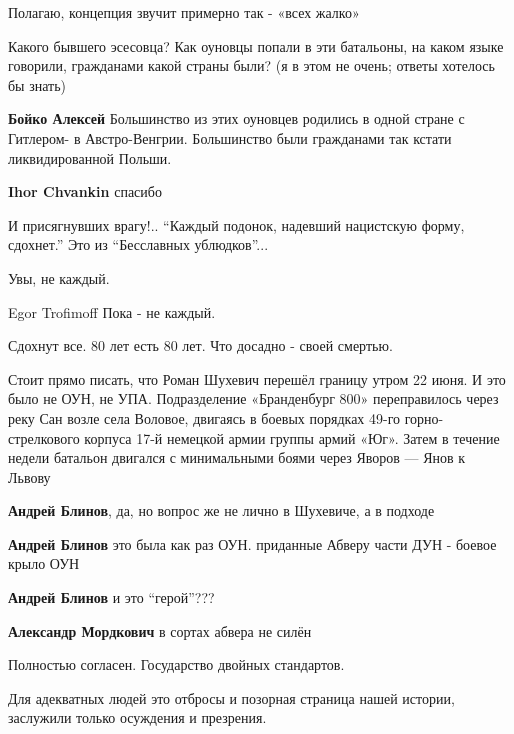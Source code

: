 \begin{itemize}

Полагаю, концепция звучит примерно так - «всех жалко»


Какого бывшего эсесовца?  Как оуновцы попали в эти батальоны, на каком языке
говорили, гражданами какой страны были?  (я в этом не очень; ответы хотелось бы
знать)


\textbf{Бойко Алексей}
Большинство из этих оуновцев родились в одной стране с Гитлером- в
Австро-Венгрии. Большинство были гражданами так кстати ликвидированной Польши.

\textbf{Ihor Chvankin} спасибо

И присягнувших врагу!..
\enquote{Каждый подонок, надевший нацистскую форму, сдохнет.} Это из \enquote{Бесславных ублюдков}...

Увы, не каждый.

Egor Trofimoff Пока - не каждый.

Сдохнут все. 80 лет есть 80 лет. Что досадно - своей смертью.


Стоит прямо писать, что Роман Шухевич перешёл границу утром 22 июня. И это было
не ОУН, не УПА. Подразделение «Бранденбург 800» переправилось через реку Сан
возле села Воловое, двигаясь в боевых порядках 49-го горно-стрелкового корпуса
17-й немецкой армии группы армий «Юг». Затем в течение недели батальон двигался
с минимальными боями через Яворов — Янов к Львову

\begin{itemize}
\textbf{Андрей Блинов}, да, но вопрос же не лично в Шухевиче, а в подходе

\textbf{Андрей Блинов} это была как раз ОУН. приданные Абверу части ДУН - боевое крыло ОУН

\textbf{Андрей Блинов} и это \enquote{герой}???

\textbf{Александр Мордкович} в сортах абвера не силён
\end{itemize}

Полностью согласен. Государство двойных стандартов.

Для адекватных людей это отбросы и позорная страница нашей истории, заслужили только осуждения и презрения.


\end{itemize}
